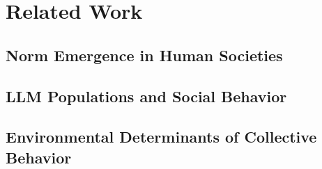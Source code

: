 \section{Related Work}
\label{sec:related}

\subsection{Norm Emergence in Human Societies}


\subsection{LLM Populations and Social Behavior}


\subsection{Environmental Determinants of Collective Behavior}

